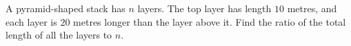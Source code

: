 A pyramid-shaped stack has $n$ layers. The top layer has length $10$ metres, and each layer is $20$ metres longer than the layer above it. Find the ratio of the total length of all the layers to $n$.
